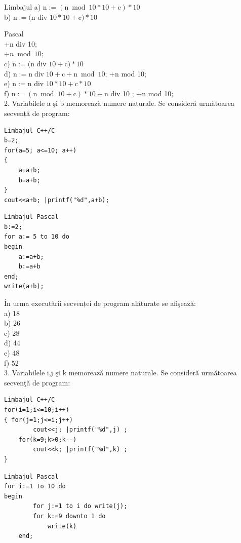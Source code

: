 \documentclass[10pt]{article}
\begin{document}
Limbajul a) $\mathrm{n}:=(\mathrm{n} \bmod 10 * 10+\mathrm{c}) * 10$\\
b) $\mathrm{n}:=(\mathrm{n}$ div $10 * 10+\mathrm{c}) * 10$

Pascal\\
+n div 10;\\
$+n \bmod 10$;\\
c) $\mathrm{n}:=(\mathrm{n}$ div $10+\mathrm{c}) * 10$\\
d) $\mathrm{n}:=\mathrm{n} \operatorname{div} 10+\mathrm{c}+\mathrm{n} \bmod 10$; +n mod 10;\\
e) $\mathrm{n}:=\mathrm{n}$ div $10 * 10+\mathrm{c} * 10$\\
f) $\mathrm{n}:=(\mathrm{n} \bmod 10+\mathrm{c}) * 10+\mathrm{n}$ div 10 ; +n mod 10;\\
2. Variabilele a şi b memorează numere naturale. Se consideră următoarea secvență de program:

\begin{verbatim}
Limbajul C++/C
b=2;
for(a=5; a<=10; a++)
{
    a=a+b;
    b=a+b;
}
cout<<a+b; |printf("%d",a+b);
\end{verbatim}

\begin{verbatim}
Limbajul Pascal
b:=2;
for a:= 5 to 10 do
begin
    a:=a+b;
    b:=a+b
end;
write(a+b);
\end{verbatim}

În urma executării secvenței de program alăturate se afişează:\\
a) 18\\
b) 26\\
c) 28\\
d) 44\\
e) 48\\
f) 52\\
3. Variabilele i,j şi k memorează numere naturale. Se consideră următoarea secvenţă de program:

\begin{verbatim}
Limbajul C++/C
for(i=1;i<=10;i++)
{ for(j=1;j<=i;j++)
        cout<<j; |printf("%d",j) ;
    for(k=9;k>0;k--)
        cout<<k; |printf("%d",k) ;
}
\end{verbatim}

\begin{verbatim}
Limbajul Pascal
for i:=1 to 10 do
begin
        for j:=1 to i do write(j);
        for k:=9 downto 1 do
            write(k)
    end;
\end{verbatim}
\end{document}
